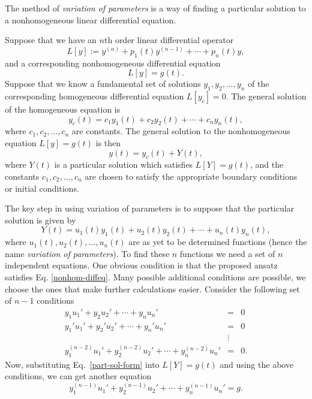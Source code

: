 \documentclass[12pt]{article}
\begin{document}
The method of \emph{variation of parameters} is a way of finding a particular
solution to a nonhomogeneous linear differential equation.

Suppose that we have an $n$th order linear differential operator
\begin{equation*}
 L[y] := y^{(n)} + p_1(t) y^{(n-1)} + \cdots + p_n(t) y ,
\end{equation*}
and a corresponding nonhomogeneous differential equation
\begin{equation}
 \label{nonhom-diffeq}
 L[y] = g(t).
\end{equation}
Suppose that we know a fundamental set of solutions
$y_1,y_2,\ldots,y_n$ of the corresponding homogeneous differential equation
$L[y_c]=0$. The general solution of the homogeneous equation is
\begin{equation*}
 y_c(t) = c_1 y_1(t) + c_2 y_2(t) + \cdots + c_n y_n(t),
\end{equation*}
where $c_1,c_2,\ldots,c_n$ are constants.
The general solution to the nonhomogeneous equation $L[y]=g(t)$ is then
\begin{equation*}
 y(t) = y_c(t) + Y(t),
\end{equation*}
where $Y(t)$ is a particular solution which satisfies $L[Y]=g(t)$, and the
constants $c_1,c_2,\ldots,c_n$ are chosen to satisfy the appropriate
boundary conditions or initial conditions.

The key step in using variation of parameters is to suppose that the
particular solution is given by
\begin{equation}
 \label{part-sol-form}
 Y(t) = u_1(t) y_1(t) + u_2(t) y_2(t) + \cdots + u_n(t) y_n(t),
\end{equation}
where $u_1(t),u_2(t),\ldots,u_n(t)$ are as yet to be determined functions
(hence the name \emph{variation of parameters}). To find
these $n$ functions we need a set of $n$ independent equations.
One obvious condition is that the proposed ansatz satisfies Eq.
\eqref{nonhom-diffeq}. Many possible additional conditions are possible,
we choose the ones that make further calculations easier. Consider the
following set of $n-1$ conditions
\begin{eqnarray*}
 y_1 u_1' + y_2 u_2' + \cdots + y_n u_n' &=& 0 \\
 y_1' u_1' + y_2' u_2' + \cdots + y_n' u_n' &=& 0 \\
  &\vdots \\
 y_1^{(n-2)} u_1' + y_2^{(n-2)} u_2' + \cdots + y_n^{(n-2)} u_n' &=& 0.
\end{eqnarray*}
Now, substituting Eq.~\eqref{part-sol-form} into $L[Y]=g(t)$ and using the
above conditions, we can get another equation
\begin{equation*}
 y_1^{(n-1)} u_1' + y_2^{(n-1)} u_2' + \cdots + y_n^{(n-1)} u_n' = g .
\end{equation*}
\end{document}
